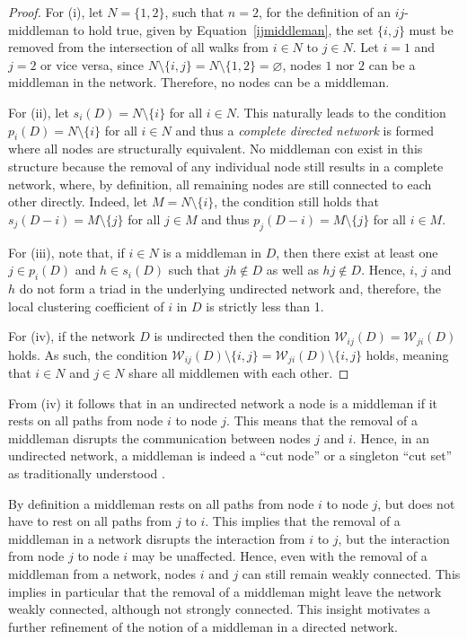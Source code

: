 \begin{proof}
For (i), let $N = \{1,2\}$, such that $n = 2$, for the definition of an $ij$-middleman to hold true, given by Equation~\ref{ijmiddleman}, the set $\{i, j\}$ must be removed from the intersection of all walks from $i \in N$ to $j \in N$. Let $i = 1$ and $j = 2$ or vice versa, since $N \setminus \{i,j\} = N \setminus \{1,2\} = \varnothing$, nodes $1$ nor $2$ can be a middleman in the network. Therefore, no nodes can be a middleman.

For (ii), let $s_{i}(D) = N \setminus \{i\}$ for all $i \in N$. This naturally leads to the condition $p_{i}(D) = N \setminus \{i\}$ for all $i \in N$ and thus a \emph{complete directed network} is formed where all nodes are structurally equivalent. No middleman con exist in this structure because the removal of any individual node still results in a complete network, where, by definition, all remaining nodes are still connected to each other directly. Indeed, let $M = N \setminus \{i\}$, the condition still holds that $s_{j}(D-i) = M \setminus \{j\}$ for all $j \in M$ and thus $p_{j}(D-i) = M \setminus \{j\}$ for all $i \in M$.

For (iii), note that, if $i \in N$ is a middleman in $D$, then there exist at least one $j \in p_i (D)$ and $h \in s_i (D)$ such that $jh \notin D$ as well as $hj \notin D$. Hence, $i$, $j$ and $h$ do not form a triad in the underlying undirected network and, therefore, the local clustering coefficient of $i$ in $D$ is strictly less than 1.

For (iv), if the network $D$ is undirected then the condition $\mathcal{W}_{ij}(D) = \mathcal{W}_{ji}(D)$ holds. As such, the condition $\mathcal{W}_{ij}(D) \setminus \{ i,j \} = \mathcal{W}_{ji}(D) \setminus \{ i,j \}$ holds, meaning that $i \in N$ and $j \in N$ share all middlemen with each other.
\end{proof}

\noindent
From (iv) it follows that in an undirected network a node is a middleman if it rests on all paths from node $i$ to node $j$. This means that the removal of a middleman disrupts the communication between nodes $j$ and $i$. Hence, in an undirected network, a middleman is indeed a ``cut node'' or a singleton ``cut set'' as traditionally understood \citep[\S 5]{Wilson2010}.

By definition a middleman rests on all paths from node $i$ to node $j$, but does not have to rest on all paths from $j$ to $i$. This implies that the removal of a middleman in a network disrupts the interaction from $i$ to $j$, but the interaction from node $j$ to node $i$ may be unaffected. Hence, even with the removal of a middleman from a network, nodes $i$ and $j$ can still remain weakly connected. This implies in particular that the removal of a middleman might leave the network weakly connected, although not strongly connected. This insight motivates a further refinement of the notion of a middleman in a directed network.

